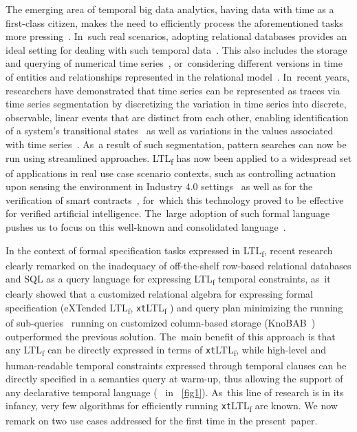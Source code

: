 \documentclass[information,article,accept,pdftex,oneauthor]{Definitions/mdpi}
\begin{document}
The emerging area of temporal big data analytics, having data with time as a first-class citizen, makes the need to efficiently process the aforementioned tasks more pressing~\cite{cuzzocrea:LIPIcs.TIME.2021.4,DBLP:reference/db/Amer-YahiaPTKDC18}. In~such real scenarios, adopting relational databases provides an ideal setting for dealing with such temporal data~\cite{DBLP:conf/caise/SchonigRCJM16}. This also includes the storage and querying of numerical
time series~\cite{DBLP:journals/pacmmod/HuangZCS23}, or~considering different versions in time of entities and relationships represented in the relational
model~\cite{5963680,DBLP:journals/pvldb/KaufmannVFKF13,DBLP:journals/isci/WangJS95,DBLP:conf/cikm/Wang95}. In~recent years, researchers have demonstrated that time series can be represented as traces via time series segmentation by discretizing the variation in time series into discrete, observable, linear events that are distinct from each other, enabling identification of a system's transitional states~\cite{DBLP:journals/pacmmod/00080ZC23} as well as variations in the values associated with time series~\cite{HUO2022117176}. As~a result of such segmentation, pattern searches can now be run using streamlined approaches. LTL\textsubscript{f} has now been applied to a widespread set of applications in real use case scenario contexts, such as controlling actuation upon sensing the environment in Industry 4.0 settings~\cite{9591387} as well as for the verification of smart contracts~\cite{10.1007/978-3-031-08421-8_9}, for~which this technology proved to be effective for verified artificial intelligence. The~large adoption of such formal language  pushes us to focus on this well-known and consolidated language~\cite{4567924,DBLP:conf/ijcai/GiacomoV13}.

In the context of formal specification tasks expressed in LTL\textsubscript{f}, recent research clearly remarked on the inadequacy of off-the-shelf row-based relational databases and SQL as a query language for expressing LTL\textsubscript{f} temporal constraints, as~it clearly showed that a customized relational algebra for expressing formal specification (eXTended LTL\textsubscript{f}, \texttt{xt}LTL\textsubscript{f} %
 \cite{info14030173}) and query plan minimizing the running of sub-queries~\cite{BellatrecheKB21} running on customized column-based storage (KnoBAB~\cite{Appleby,info14030173}) outperformed the previous solution. The~main benefit of this approach is that any LTL\textsubscript{f} can be directly expressed in terms of \texttt{xt}LTL\textsubscript{f}, while high-level and human-readable temporal constraints expressed through temporal clauses can be directly specified in a semantics query at warm-up, thus allowing the support of any declarative temporal language (\texttt{\color{oceanboatblue}{queryplan}%
} in \figurename~\ref{fig1}). As~this line of research is in its infancy, very few algorithms for efficiently running \texttt{xt}LTL\textsubscript{f} are known. We now remark on two use cases addressed for the first time in the present~paper.
\end{document}
